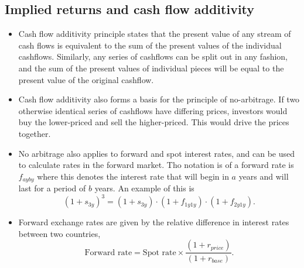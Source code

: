 \documentclass[../notes_compiled.tex]{subfiles}
\begin{document}
\subsection{Implied returns and cash flow additivity}
\begin{itemize}
\item Cash flow additivity principle states that the present value of any stream of cash flows is equivalent to the sum of the present values of the individual cashflows. Similarly, any series of cashflows can be split out in any fashion, and the sum of the present values of individual pieces will be equal to the present value of the original cashflow.
\item Cash flow additivity also forms a basis for the principle of no-arbitrage. If two otherwise identical series of cashflows have differing prices, investors would buy the lower-priced and sell the higher-priced. This would drive the prices together.
\item No arbitrage also applies to forward and spot interest rates, and can be used to calculate rates in the forward market. Tho notation is of a forward rate is $f_{ayby}$ where this denotes the interest rate that will begin in $a$ years and will last for a period of $b$ years. An example of this is
\begin{equation}
(1+s_{3y})^{3} = (1+s_{3y})\cdot(1+f_{1y1y})\cdot(1+f_{2y1y}).
\end{equation}
\item Forward exchange rates are given by the relative difference in interest rates between two countries,
\begin{equation}
\text{Forward rate} = \text{Spot rate} \times \frac{\left(1+r_{price}\right)}{\left(1+r_{base}\right)}.
\end{equation}
\end{itemize}
\end{document}
